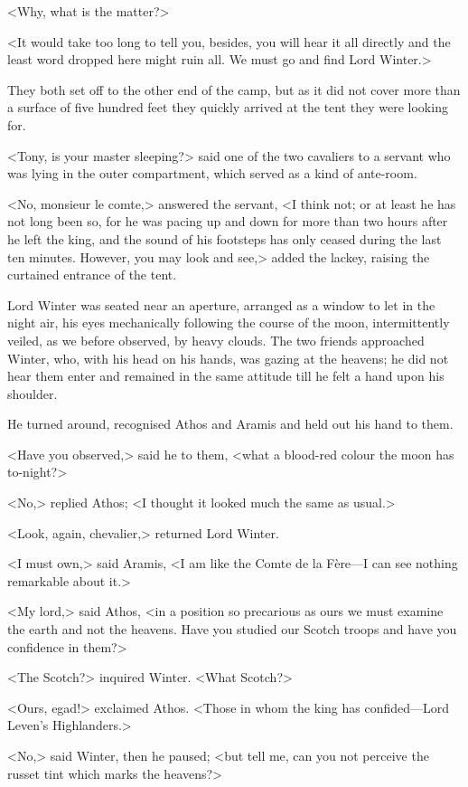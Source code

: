 <Why, what is the matter?>

<It would take too long to tell you, besides, you will hear it all directly and the least word dropped here might ruin all. We must go and find Lord Winter.>

They both set off to the other end of the camp, but as it did not cover more than a surface of five hundred feet they quickly arrived at the tent they were looking for.

<Tony, is your master sleeping?> said one of the two cavaliers to a servant who was lying in the outer compartment, which served as a kind of ante-room.

<No, monsieur le comte,> answered the servant, <I think not; or at least he has not long been so, for he was pacing up and down for more than two hours after he left the king, and the sound of his footsteps has only ceased during the last ten minutes. However, you may look and see,> added the lackey, raising the curtained entrance of the tent.

Lord Winter was seated near an aperture, arranged as a window to let in the night air, his eyes mechanically following the course of the moon, intermittently veiled, as we before observed, by heavy clouds. The two friends approached Winter, who, with his head on his hands, was gazing at the heavens; he did not hear them enter and remained in the same attitude till he felt a hand upon his shoulder.

He turned around, recognised Athos and Aramis and held out his hand to them.

<Have you observed,> said he to them, <what a blood-red colour the moon has to-night?>

<No,> replied Athos; <I thought it looked much the same as usual.>

<Look, again, chevalier,> returned Lord Winter.

<I must own,> said Aramis, <I am like the Comte de la Fère—I can see nothing remarkable about it.>

<My lord,> said Athos, <in a position so precarious as ours we must examine the earth and not the heavens. Have you studied our Scotch troops and have you confidence in them?>

<The Scotch?> inquired Winter. <What Scotch?>

<Ours, egad!> exclaimed Athos. <Those in whom the king has confided—Lord Leven's Highlanders.>

<No,> said Winter, then he paused; <but tell me, can you not perceive the russet tint which marks the heavens?>

